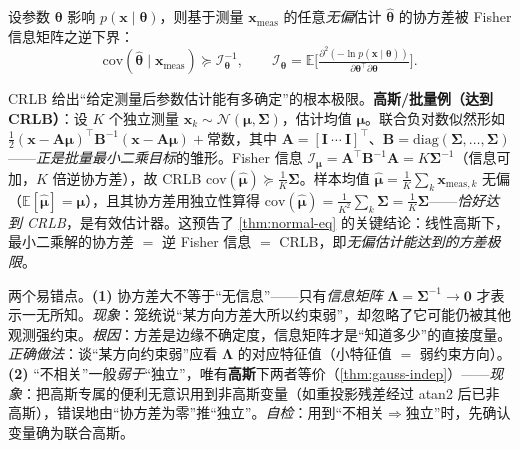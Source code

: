 \begin{theorem}\label{thm:crlb}
设参数 $\boldsymbol{\theta}$ 影响 $p(\mathbf{x}\mid\boldsymbol{\theta})$，则基于测量 $\mathbf{x}_{\text{meas}}$ 的任意\emph{无偏}估计 $\hat{\boldsymbol{\theta}}$ 的协方差被 Fisher 信息矩阵之逆下界：
\begin{equation}
  \mathrm{cov}(\hat{\boldsymbol{\theta}}\mid\mathbf{x}_{\text{meas}})\succeq\boldsymbol{\mathcal{I}}_{\boldsymbol{\theta}}^{-1},\qquad
  \boldsymbol{\mathcal{I}}_{\boldsymbol{\theta}}=\mathbb{E}\Big[\tfrac{\partial^2(-\ln p(\mathbf{x}\mid\boldsymbol{\theta}))}{\partial\boldsymbol{\theta}^\top\partial\boldsymbol{\theta}}\Big].
  \label{eq:crlb}
\end{equation}
\end{theorem}
\noindent CRLB 给出“给定测量后参数估计能有多确定”的根本极限。\textbf{高斯/批量例（达到 CRLB）}：设 $K$ 个独立测量 $\mathbf{x}_k\sim\mathcal{N}(\boldsymbol{\mu},\boldsymbol{\Sigma})$，估计均值 $\boldsymbol{\mu}$。联合负对数似然形如 $\tfrac12(\mathbf{x}-\mathbf{A}\boldsymbol{\mu})^\top\mathbf{B}^{-1}(\mathbf{x}-\mathbf{A}\boldsymbol{\mu})+\text{常数}$，其中 $\mathbf{A}=[\mathbf{I}\ \cdots\ \mathbf{I}]^\top$、$\mathbf{B}=\mathrm{diag}(\boldsymbol{\Sigma},\dots,\boldsymbol{\Sigma})$——\emph{正是批量最小二乘目标}的雏形。Fisher 信息 $\boldsymbol{\mathcal{I}}_{\boldsymbol{\mu}}=\mathbf{A}^\top\mathbf{B}^{-1}\mathbf{A}=K\boldsymbol{\Sigma}^{-1}$（信息可加，$K$ 倍逆协方差），故 CRLB $\mathrm{cov}(\hat{\boldsymbol{\mu}})\succeq\tfrac1K\boldsymbol{\Sigma}$。样本均值 $\hat{\boldsymbol{\mu}}=\tfrac1K\sum_k\mathbf{x}_{\text{meas},k}$ 无偏（$\mathbb{E}[\hat{\boldsymbol{\mu}}]=\boldsymbol{\mu}$），且其协方差用独立性算得 $\mathrm{cov}(\hat{\boldsymbol{\mu}})=\tfrac1{K^2}\sum_k\boldsymbol{\Sigma}=\tfrac1K\boldsymbol{\Sigma}$——\emph{恰好达到 CRLB}，是有效估计器。这预告了 \cref{thm:normal-eq} 的关键结论：线性高斯下，最小二乘解的协方差 $=$ 逆 Fisher 信息 $=$ CRLB，即\emph{无偏估计能达到的方差极限}。

\begin{pitfall}[概念误区：协方差“大”当成“没用”，以及不相关$=$独立]
两个易错点。\textbf{(1)} 协方差大不等于“无信息”——只有\emph{信息矩阵} $\boldsymbol{\Lambda}=\boldsymbol{\Sigma}^{-1}\to\mathbf{0}$ 才表示一无所知。\emph{现象}：笼统说“某方向方差大所以约束弱”，却忽略了它可能仍被其他观测强约束。\emph{根因}：方差是边缘不确定度，信息矩阵才是“知道多少”的直接度量。\emph{正确做法}：谈“某方向约束弱”应看 $\boldsymbol{\Lambda}$ 的对应特征值（小特征值 $=$ 弱约束方向）。\textbf{(2)} “不相关”一般\emph{弱于}“独立”，唯有\textbf{高斯}下两者等价（\cref{thm:gauss-indep}）——\emph{现象}：把高斯专属的便利无意识用到非高斯变量（如重投影残差经过 atan2 后已非高斯），错误地由“协方差为零”推“独立”。\emph{自检}：用到“不相关$\Rightarrow$独立”时，先确认变量确为联合高斯。
\end{pitfall}

